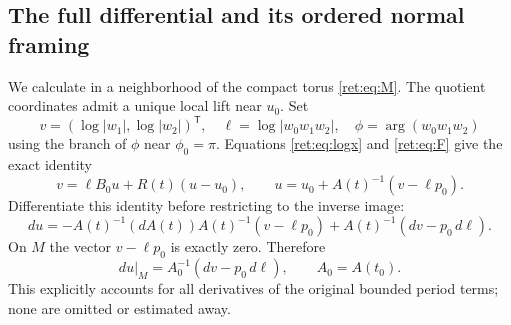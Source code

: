 \documentclass[11pt,letterpaper]{article}
\numberwithin{equation}{section}
\theoremstyle{definition}
\theoremstyle{remark}
\begin{document}
\subsection{The full differential and its ordered normal framing}

We calculate in a neighborhood of the compact torus \eqref{ret:eq:M}.
The quotient coordinates admit a unique local lift near \(u_0\).
Set
\[
 v=(\log|w_1|,\log|w_2|)^{\mathsf T},\quad
 \ell=\log|w_0w_1w_2|,\quad
 \phi=\arg(w_0w_1w_2)
\]
using the branch of \(\phi\) near \(\phi_0=\pi\).
Equations \eqref{ret:eq:logx} and \eqref{ret:eq:F} give the exact identity
\begin{equation}
 v=\ell B_0u+R(t)(u-u_0),\qquad
 u=u_0+A(t)^{-1}(v-\ell p_0).
 \label{ret:eq:exact-u}
\end{equation}
Differentiate this identity before restricting to the inverse image:
\begin{equation}
 du=-A(t)^{-1}(dA(t))A(t)^{-1}(v-\ell p_0)
        +A(t)^{-1}(dv-p_0\,d\ell).
 \label{ret:eq:full-derivative}
\end{equation}
On \(M\) the vector \(v-\ell p_0\) is exactly zero.  Therefore
\begin{equation}
 du|_M=A_0^{-1}(dv-p_0\,d\ell),\qquad A_0=A(t_0).
 \label{ret:eq:derivative-on-M}
\end{equation}
This explicitly accounts for all derivatives of the original bounded
period terms; none are omitted or estimated away.
\end{document}
